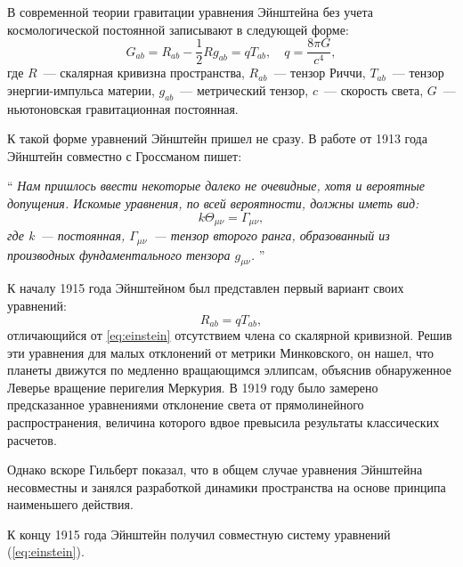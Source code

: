 \documentclass[\docroot/reports/draft/report.tex]{subfiles}
\begin{document}
    В современной теории гравитации уравнения Эйнштейна без учета космологической постоянной записывают в следующей форме:
    \begin{equation}\label{eq:einstein}
        G_{ab} = R_{ab} - \frac{1}{2} R g_{ab} = q T_{ab}, \quad
        q = \frac{8 \pi G}{c^4},
    \end{equation}
    где $R$~--- скалярная кривизна пространства, $R_{ab}$~--- тензор Риччи, $T_{ab}$~--- тензор энергии-импульса материи, $g_{ab}$~--- метрический тензор, $c$~--- скорость света, $G$~--- ньютоновская гравитационная постоянная.

    К такой форме уравнений Эйнштейн пришел не сразу. В работе от 1913 года Эйнштейн совместно с Гроссманом пишет:

    \enquote{\textit{%
        Нам пришлось ввести некоторые далеко не очевидные, хотя
        и вероятные допущения. Искомые уравнения, по всей вероятности, должны иметь вид:
        \begin{equation*}
            k \Theta_{\mu\nu} = \Gamma_{\mu\nu},
        \end{equation*}
        где k~--- постоянная, $\Gamma_{\mu\nu}$~--- тензор второго ранга, образованный из производных фундаментального тензора $g_{\mu\nu}$.%
    }}

    К началу 1915 года Эйнштейном был представлен первый вариант своих уравнений:
    \begin{equation*}
        R_{ab} = q T_{ab},
    \end{equation*}
    отличающийся от \autoref{eq:einstein} отсутствием члена со скалярной кривизной. Решив эти уравнения для малых отклонений от метрики Минковского, он нашел, что планеты движутся по медленно вращающимся эллипсам, объяснив обнаруженное Леверье вращение перигелия Меркурия. В 1919 году было замерено предсказанное уравнениями отклонение света от прямолинейного распространения, величина которого вдвое превысила результаты классических расчетов.

    Однако вскоре Гильберт показал, что в общем случае уравнения Эйнштейна несовместны и занялся разработкой динамики пространства на основе принципа наименьшего действия.

    К концу 1915 года Эйнштейн получил совместную систему уравнений (\autoref{eq:einstein}).
\end{document}
